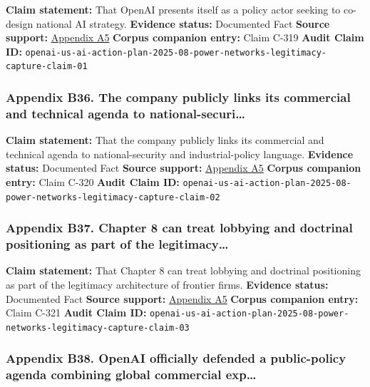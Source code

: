 \documentclass[
  american,
  11pt,
  letterpaper,
]{article}
\begin{document}
\textbf{Claim statement:} That OpenAI presents itself as a policy actor
seeking to co-design national AI strategy. \textbf{Evidence status:}
Documented Fact \textbf{Source support:}
\hyperref[ch-07-appendix-a5-openais-proposals-for-the-us-ai-action-plan]{Appendix
A5} \textbf{Corpus companion entry:} Claim C-319 \textbf{Audit Claim
ID:}
\texttt{openai-us-ai-action-plan-2025-08-power-networks-legitimacy-capture-claim-01}

\subsubsection{Appendix B36. The company publicly links its commercial
and technical agenda to
national-securi\ldots{}}\label{ch-07-appendix-b36-the-company-publicly-links-its-commercial-and-technical-agenda-to-national-securi}

\textbf{Claim statement:} That the company publicly links its commercial
and technical agenda to national-security and industrial-policy
language. \textbf{Evidence status:} Documented Fact \textbf{Source
support:}
\hyperref[ch-07-appendix-a5-openais-proposals-for-the-us-ai-action-plan]{Appendix
A5} \textbf{Corpus companion entry:} Claim C-320 \textbf{Audit Claim
ID:}
\texttt{openai-us-ai-action-plan-2025-08-power-networks-legitimacy-capture-claim-02}

\subsubsection{Appendix B37. Chapter 8 can treat lobbying and doctrinal
positioning as part of the
legitimacy\ldots{}}\label{ch-07-appendix-b37-chapter-8-can-treat-lobbying-and-doctrinal-positioning-as-part-of-the-legitimacy}

\textbf{Claim statement:} That Chapter 8 can treat lobbying and
doctrinal positioning as part of the legitimacy architecture of frontier
firms. \textbf{Evidence status:} Documented Fact \textbf{Source
support:}
\hyperref[ch-07-appendix-a5-openais-proposals-for-the-us-ai-action-plan]{Appendix
A5} \textbf{Corpus companion entry:} Claim C-321 \textbf{Audit Claim
ID:}
\texttt{openai-us-ai-action-plan-2025-08-power-networks-legitimacy-capture-claim-03}

\subsubsection{Appendix B38. OpenAI officially defended a public-policy
agenda combining global commercial
exp\ldots{}}\label{ch-07-appendix-b38-openai-officially-defended-a-public-policy-agenda-combining-global-commercial-exp}
\end{document}

